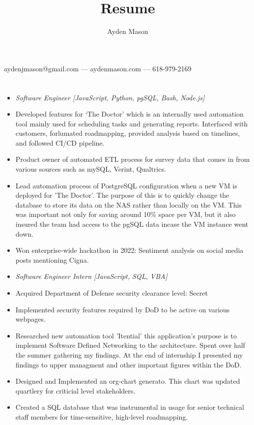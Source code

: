 \documentclass{article}
\makeatletter
\renewcommand{\maketitle}{

\begin{center}
{\huge\bfseries
\theauthor}


aydenjmason@gmail.com --- aydenmason.com --- 618-979-2169
\end{center}
}
\makeatother
\begin{document}
\bgroup\obeylines
\title{Resume}
\author{Ayden Mason}

\maketitle
\section{}
\begin{itemize}
\subsection{Cigna\hfill\mdseries July 2021 - Present}


 \item[] \textit{Software Engineer [JavaScript, Python, pgSQL, Bash, Node.js]}
\item Developed features for ‘The Doctor’ which is an internally used automation tool mainly used for scheduling tasks and generating reports. Interfaced with customers, forlumated roadmapping,  provided analysis based on timelines, and followed CI/CD pipeline.
\item Product owner of automated ETL process for survey data that comes in from various sources such as mySQL, Verint, Qualtrics.
\item Lead automation process of PostgreSQL configuration when a new VM is deployed for 'The Doctor'. The  purpose of this is to quickly change the database to store its data on the NAS rather than locally on the VM. This was important not only for saving around 10\% space per VM, but it also insured the team had access to the pgSQL data incase the VM instance went down.
\item Won enterprise-wide hackathon in 2022: Sentiment analysis on social media posts mentioning Cigna.\\
\end{itemize}
\begin{itemize}
\subsection*{Leidos\hfill\mdseries Summer 2019/2020}
\item[] \textit{Software Engineer Intern [JavaScript, SQL, VBA]}
\item Acquired Department of Defense security clearance level: Secret
\item Implemented security features required by DoD to be active on various webpages.
\item Researched new automation tool 'Itential' this application's purpose is to implement Software Defined Networking to the architecture. Spent over half the summer gathering my findings. At the end of internship I presented my findings to upper managment and other important figures within the DoD.
\item Designed and Implemented an org-chart generato. This chart was updated quartlery for criticial level stakeholders.
\item Created a SQL database that was instrumental in usage for senior technical staff members for time-sensitive, high-level roadmapping.
\end{itemize}
\end{document}
